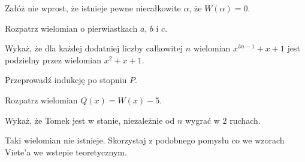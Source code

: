 
\begin{hints_list}
	\item Załóż nie wprost, że istnieje pewne niecałkowite $\alpha$, że $W(\alpha) = 0$.
	\item Rozpatrz wielomian o pierwiastkach $a$, $b$ i $c$.
	\item Wykaż, że dla każdej dodatniej liczby całkowitej $n$ wielomian $x^{3n - 1} + x + 1$ jest podzielny przez wielomian $x^2 + x + 1$.
	\item Przeprowadź indukcję po stopniu $P$.
	\item Rozpatrz wielomian $Q(x) = W(x) - 5$.
	\item Wykaż, że Tomek jest w stanie, niezależnie od $n$ wygrać w $2$ ruchach.
	\item Taki wielomian nie istnieje. Skorzystaj z podobnego pomysłu co we wzorach Viete'a we wstepie teoretycznym.
\end{hints_list}